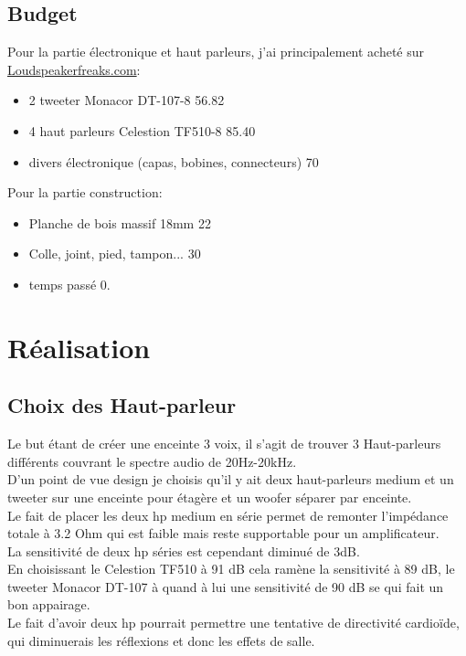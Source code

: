 \documentclass[a4paper,english]{report}
\begin{document}
			\section{Budget}
			Pour la partie électronique et haut parleurs, j'ai principalement acheté sur \href{http://loudspeakerfreaks.com/intro.asp}{Loudspeakerfreaks.com}:
			\begin{itemize}
				\item 2 tweeter Monacor DT-107-8 56.82 \texteuro
				\item 4 haut parleurs Celestion TF510-8 85.40\texteuro
				\item divers électronique (capas, bobines, connecteurs) 70\texteuro

			\end{itemize}
			Pour la partie construction:
			\begin{itemize}
				\item Planche de bois massif 18mm 22\texteuro 
				\item Colle, joint, pied, tampon... 30\texteuro
				\item temps passé 0\texteuro.				
			\end{itemize}
			
			\chapter{Réalisation}
			
			\section{Choix des Haut-parleur}
			Le but étant de créer une enceinte 3 voix, il s'agit de trouver 3 Haut-parleurs différents couvrant le spectre audio de 20Hz-20kHz.\\
			D'un point de vue design je choisis qu'il y ait deux haut-parleurs medium et un tweeter sur une enceinte pour étagère et un woofer séparer par enceinte.\\
			Le fait de placer les deux hp medium en série permet de remonter l'impédance totale à 3.2 Ohm qui est faible mais reste supportable pour un amplificateur.\\
			La sensitivité de deux hp séries est cependant diminué de 3dB. \\
			En choisissant le Celestion TF510 à 91 dB cela ramène la sensitivité à 89 dB, le tweeter Monacor DT-107 à quand à lui une sensitivité de 90 dB se qui fait un bon appairage.\\
			Le fait d'avoir deux hp pourrait permettre une tentative de directivité cardioïde, qui diminuerais les réflexions et donc les effets de salle.
			
\end{document}
